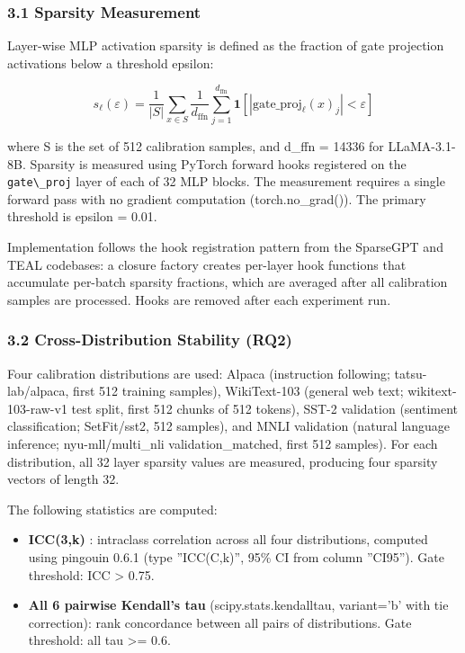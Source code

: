 
\subsubsection{3.1 Sparsity Measurement}

Layer-wise MLP activation sparsity is defined as the fraction of gate projection activations below a threshold epsilon:

$$s_\ell(\varepsilon) = \frac{1}{|S|} \sum_{x \in S} \frac{1}{d_{\text{ffn}}} \sum_{j=1}^{d_{\text{ffn}}} \mathbf{1}\left[|\text{gate\_proj}_\ell(x)_j| < \varepsilon\right]$$

where S is the set of 512 calibration samples, and d\_ffn = 14336 for LLaMA-3.1-8B. Sparsity is measured using PyTorch forward hooks registered on the \texttt{gate\textbackslash \_proj} layer of each of 32 MLP blocks. The measurement requires a single forward pass with no gradient computation (torch.no\_grad()). The primary threshold is epsilon = 0.01.

Implementation follows the hook registration pattern from the SparseGPT and TEAL codebases: a closure factory creates per-layer hook functions that accumulate per-batch sparsity fractions, which are averaged after all calibration samples are processed. Hooks are removed after each experiment run.

\subsubsection{3.2 Cross-Distribution Stability (RQ2)}

Four calibration distributions are used: Alpaca (instruction following; tatsu-lab/alpaca, first 512 training samples), WikiText-103 (general web text; wikitext-103-raw-v1 test split, first 512 chunks of 512 tokens), SST-2 validation (sentiment classification; SetFit/sst2, 512 samples), and MNLI validation (natural language inference; nyu-mll/multi\_nli validation\_matched, first 512 samples). For each distribution, all 32 layer sparsity values are measured, producing four sparsity vectors of length 32.

The following statistics are computed:

\begin{itemize}
\item \textbf{ICC(3,k)} \citep{shrout1979intraclass}: intraclass correlation across all four distributions, computed using pingouin 0.6.1 (type ''ICC(C,k)'', 95\% CI from column ''CI95''). Gate threshold: ICC > 0.75.
\item \textbf{All 6 pairwise Kendall's tau} (scipy.stats.kendalltau, variant='b' with tie correction): rank concordance between all pairs of distributions. Gate threshold: all tau >= 0.6.
\end{itemize}

